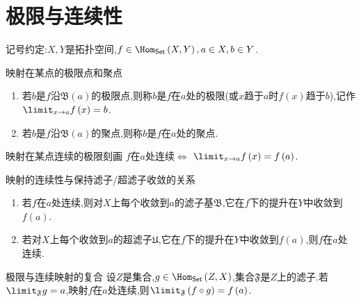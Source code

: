 \section{极限与连续性}

记号约定:$X,Y$是拓扑空间,$f\in\Hom_{\mathsf{Set}}\left(X,Y\right),a\in X,b\in Y$.

\begin{definition}{映射在某点的极限点和聚点}{}
	\begin{enumerate}
		\item 若$b$是$f$沿$\mathfrak{B}\left(a\right)$的极限点,则称$b$是$f$在$a$处的极限(或$x$趋于$a$时$f\left(x\right)$趋于$b$),记作$\limit_{x\to a}f\left(x\right)=b$.
		\item 若$b$是$f$沿$\mathfrak{B}\left(a\right)$的聚点,则称$b$是$f$在$a$处的聚点.
	\end{enumerate}
\end{definition}

\begin{proposition}{映射在某点连续的极限刻画}{}
	$f$在$a$处连续$\iff$ $\limit_{x\to a}f\left(x\right)=f\left(a\right)$.
\end{proposition}

\begin{corollary}{映射的连续性与保持滤子/超滤子收敛的关系}{}
	\begin{enumerate}
		\item 若$f$在$a$处连续,则对$X$上每个收敛到$a$的滤子基$\mathfrak{B}$,它在$f$下的提升在$Y$中收敛到$f\left(a\right)$.
		\item 若对$X$上每个收敛到$a$的超滤子$\mathfrak{U}$,它在$f$下的提升在$Y$中收敛到$f\left(a\right)$,则$f$在$a$处连续.
	\end{enumerate}
\end{corollary}

\begin{corollary}{极限与连续映射的复合}{}
	设$Z$是集合,$g\in\Hom_{\mathsf{Set}}\left(Z,X\right)$,集合$\mathfrak{F}$是$Z$上的滤子.若$\limit_{\mathfrak{F}}g=a$,映射$f$在$a$处连续,则$\limit_{\mathfrak{F}}\left(f\circ g\right)=f\left(a\right)$.
\end{corollary}
